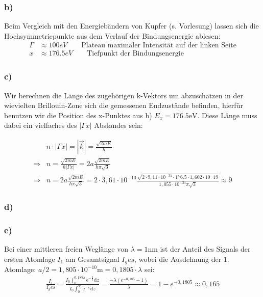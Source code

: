 \subsubsection*{b)}
Beim Vergleich mit den Energiebändern von Kupfer (s. Vorlesung) lassen sich die Hochsymmetriepunkte aus dem Verlauf der Bindungsenergie ablesen:
\begin{align*}
\Gamma &\approx 100 \unit{eV}\qquad\text{Plateau maximaler  Intensität auf der linken Seite}\\
x &\approx 176.5\unit{eV} \qquad\text{Tiefpunkt der Bindungsenergie}
\end{align*}
\subsubsection*{c)}
Wir berechnen die Länge des zugehörigen k-Vektors um abzuschätzen in der wievielten
Brillouin-Zone sich die gemessenen Endzustände befinden, hierfür benutzen wir die
Position des x-Punktes aus b) $E_x = 176.5 \mathrm{eV}$. Diese Länge muss dabei ein
vielfaches des $|\Gamma x|$ Abstandes sein:


\begin{align*}
&n\cdot |\Gamma x| = |\vec{k}| = \frac{\sqrt{2mE}}{\hbar}\\
\Rightarrow & n = \frac{\sqrt{2mE}}{\hbar|\Gamma x|} = 2a\frac{\sqrt{2mE}}{\hbar\pi\sqrt{3}}\\
\Rightarrow & n =  2a\frac{\sqrt{2mE}}{\hbar\pi\sqrt{3}} = 2\cdot3,61\cdot10^{-10}\frac{\sqrt{2\cdot9,11\cdot10^{-31}\cdot176.5\cdot1,602\cdot10^-19}}{1,055\cdot10^{-34}\pi\sqrt{3}} \approx 9
\end{align*}
\subsubsection*{d)}

\subsubsection*{e)}
Bei einer mittleren freien Weglänge von $\lambda = 1\mathrm{nm}$ ist der Anteil des Signals der ersten Atomlage $I_1$ am Gesamtsignal $I_ges$, wobei die Ausdehnung der 1. Atomlage: $a/2 = 1,805\cdot10^{-10} \mathrm{m} = 0,1805\cdot \lambda$ sei:
\begin{align*}
\frac{I_1}{I_ges} = \frac{I_0\int_0^{0,185\lambda}\mathrm{e}^{-\frac{z}{\lambda}}\mathrm{d}z}{I_0\int_0^{\infty}\mathrm{e}^{-\frac{z}{\lambda}}\mathrm{d}z} = \frac{-\lambda(e^{-0,185}-1)}{\lambda} = 1-e^{-0,1805} \approx 0,165
\end{align*}
